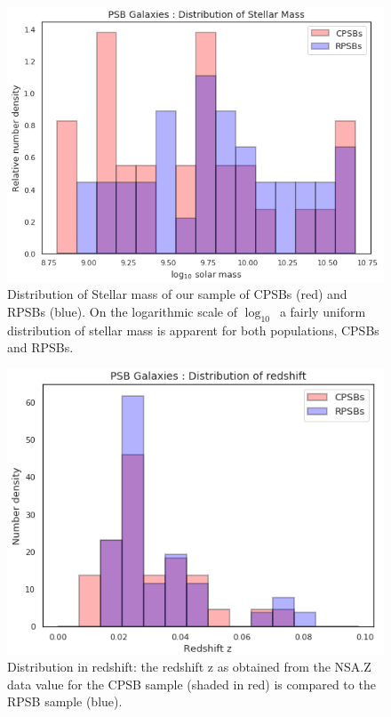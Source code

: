 \begin{figure}
    \centering
    \includegraphics[width=\columnwidth]{images/JupyterPlots/Dist-Stellar-Mass-All.png}
    \caption{Distribution of Stellar mass of our sample of CPSBs (red) and RPSBs (blue). On the logarithmic scale of $\log_{10}$\Msun\ a fairly uniform distribution of stellar mass is apparent for both populations, CPSBs and RPSBs.}
    \label{fig:stellar-mass-plot}
\end{figure}

\begin{figure}
    \centering
    \includegraphics[width=\columnwidth]{images/JupyterPlots/Dist-z-All.png}
    \caption[PSB distribution in redshift]{Distribution in redshift: the redshift z as obtained from the NSA.Z data value for the CPSB sample (shaded in red) is compared to the RPSB sample (blue).}
    \label{fig:redshift-plot}
\end{figure}

